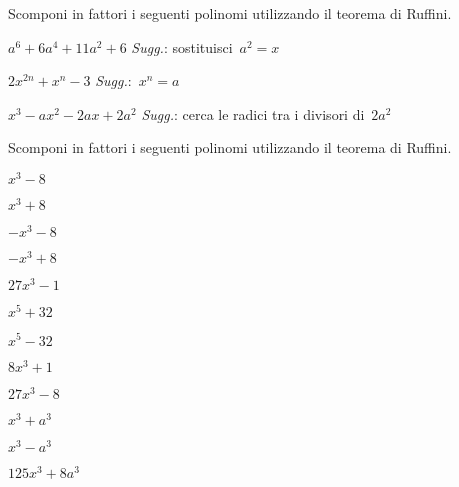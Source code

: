 \begin{esercizio}[*]
\label{ese:17.15}
Scomponi in fattori i seguenti polinomi utilizzando il teorema di Ruffini.
\begin{enumeratea}
\item \(a^{6}+6a^{4}+11a^{2}+6\)
\quad \emph{Sugg.}: sostituisci~\(a^{2}=x\)
\item \(2x^{2n}+x^{n}-3\)
\quad \emph{Sugg.}:~\(x^{n}=a\)
\item \(x^{3}-ax^{2}-2ax+2a^{2}\)
\quad \emph{Sugg.}: cerca le radici tra i divisori di~\(2a^{2}\)
\end{enumeratea}
\end{esercizio}

\begin{esercizio}
\label{ese:17.11}
Scomponi in fattori i seguenti polinomi utilizzando il teorema di Ruffini.
\begin{htmulticols}{4}
\begin{enumeratea}
\item \(x^{3}-8\)
\item \(x^{3}+8\)
\item \(-x^{3}-8\)
\item \(-x^{3}+8\)
\item \(27x^{3}-1\)
\item \(x^{5}+32\)
\item \(x^{5}-32\)
\item \(8x^{3}+1\)
\item \(27x^{3}-8\)
\item \(x^{3}+a^{3}\)
\item \(x^{3}-a^{3}\)
\item \(125x^{3}+8a^{3}\)
\end{enumeratea}
\end{htmulticols}
\end{esercizio}

\subsubsection*{}


